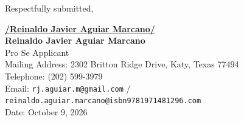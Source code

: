 \documentclass[11pt,letterpaper]{article}
\begin{document}
\vspace{0.8cm}
\begin{singlespace}
\noindent Respectfully submitted, \par\vspace{1.5cm}
\underline{\textbf{/Reinaldo Javier Aguiar Marcano/}} \\
\textbf{Reinaldo Javier Aguiar Marcano} \\
Pro Se Applicant \\
Mailing Address: 2302 Britton Ridge Drive, Katy, Texas 77494 \\
Telephone: (202) 599-3979 \\
Email: \texttt{rj.aguiar.m@gmail.com} / \texttt{reinaldo.aguiar.marcano@isbn9781971481296.com} \\
Date: October 9, 2026
\end{singlespace}
\end{document}
